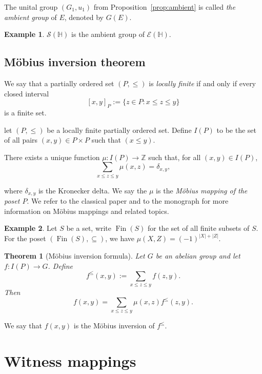 \documentclass[letterpaper]{amsart}
\newtheorem{theorem}{Theorem}
\theoremstyle{definition}
\newtheorem{example}{Example}
\DeclareMathOperator*\Fin{Fin}
\begin{document}
The unital group $(G_1,u_1)$ from Proposition~\ref{prop:ambient} is
called {\em the ambient group} of $E$, denoted by $G(E)$.

\begin{example}
$\mathcal S(\mathbb H)$ is the ambient group of $\mathcal E(\mathbb H)$.
\end{example}

\subsection{M\"obius inversion theorem}

We say that a partially ordered set $(P,\leq)$ is {\em locally finite} if and only if
every closed interval 
$$
[x,y]_P:=\{z\in P:x\leq z\leq y\}
$$
is a finite set.

let $(P,\leq)$ be a locally finite 
partially ordered set. Define $I(P)$ to be the set of all pairs
$(x,y)\in P\times P$ such that $(x\leq y)$.

There exists a unique function $\mu:I(P)\to\mathbb Z$ such that, for all $(x,y)\in I(P)$,
\begin{equation}\label{eq:mobius}
\sum_{x\leq z \leq y}\mu(x,z)=\delta_{x,y},
\end{equation}

where $\delta_{x,y}$ is the Kronecker delta. We say the $\mu$ is the 
{\em M\"obius mapping of the poset $P$}. We refer to the classical paper
\cite{Rot:OtfoctIToMF} and to the monograph \cite{Sta:EC} 
for more information on M\"obius mappings and related topics.

\begin{example}
Let $S$ be a set, write $\Fin(S)$ for the set of all
finite subsets of $S$. For the poset $(\Fin(S),\subseteq)$,
we have $\mu(X,Z)=(-1)^{|X|+|Z|}$.
\end{example}

\begin{theorem}[M\"obius inversion formula]
Let $G$ be an abelian group and let $f:I(P)\to G$. 
Define $$f^{\leq}(x,y):=\sum_{x\leq z\leq y}f(z,y).$$
Then
$$
f(x,y)=\sum_{x\leq z\leq y}\mu(x,z)f^{\leq}(z,y).
$$
\end{theorem}

We say that $f(x,y)$ is the M\"obius inversion of $f^{\leq}$.

\section{Witness mappings}
\end{document}
